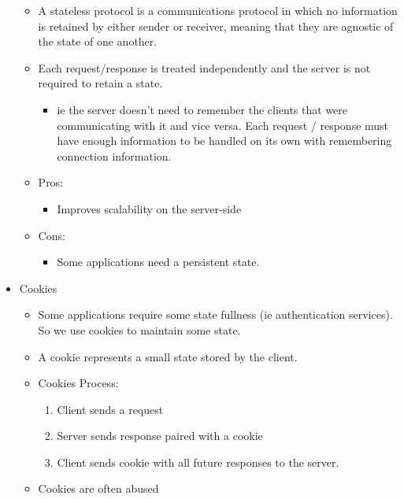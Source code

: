 \begin{itemize}
  \begin{itemize}
  \tightlist
  \item
    A stateless protocol is a communications protocol in which no
    information is retained by either sender or receiver, meaning that
    they are agnostic of the state of one another.
  \item
    Each request/response is treated independently and the server is not
    required to retain a state.

    \begin{itemize}
    \tightlist
    \item
      ie the server doesn't need to remember the clients that were
      communicating with it and vice versa. Each request / response must
      have enough information to be handled on its own with remembering
      connection information.
    \end{itemize}
  \item
    Pros:

    \begin{itemize}
    \tightlist
    \item
      Improves scalability on the server-side
    \end{itemize}
  \item
    Cons:

    \begin{itemize}
    \tightlist
    \item
      Some applications need a persistent state.
    \end{itemize}
  \end{itemize}
\item
  Cookies

  \begin{itemize}
  \tightlist
  \item
    Some applications require some state fullness (ie authentication
    services). So we use cookies to maintain some state.
  \item
    A cookie represents a small state stored by the client.
  \item
    Cookies Process:

    \begin{enumerate}
    \def\labelenumi{\arabic{enumi}.}
    \tightlist
    \item
      Client sends a request
    \item
      Server sends response paired with a cookie
    \item
      Client sends cookie with all future responses to the server.
    \end{enumerate}
  \item
    Cookies are often abused


\end{itemize}
\end{itemize}
